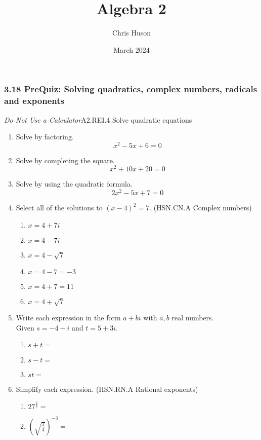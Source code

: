 \documentclass[12pt, twoside]{article}
\title{Algebra 2}
\author{Chris Huson}
\date{March 2024}
\begin{document}
\subsubsection*{3.18 PreQuiz: Solving quadratics, complex numbers, radicals and exponents }
\emph{Do Not Use a Calculator}\hfill A2.REI.4 Solve quadratic equations
\begin{enumerate}

\item Solve by factoring.
$$x^2 - 5x + 6 = 0$$ \vspace{3cm}

\item Solve by completing the square.
$$x^2 + 10x + 20 = 0$$ \vspace{6cm}

\item Solve by using the quadratic formula.
$$2x^2 - 5x + 7 = 0$$ \vspace{4cm}

\newpage 
\item Select all of the solutions to $(x-4)^2=7$. \hfill (HSN.CN.A Complex numbers)
    \begin{multicols}{2}
    \begin{enumerate}
        \item $x= 4+7i$
        \item $x= 4-7i$
        \item $x= 4 - \sqrt{7}$
        \item $x= 4-7 = -3$
        \item $x= 4+7 = 11$
        \item $x= 4 + \sqrt{7}$
    \end{enumerate}
    \end{multicols}

\item Write each expression in the form $a+bi$ with $a,b$ real numbers. \\[0.25cm]
    Given  $s = -4 - i $ and $t = 5 + 3i$.
        \begin{enumerate}[itemsep=1.5cm]
            \item $s+t =$
            \item $s-t =$
            \item $st =$
        \end{enumerate} \vspace{3cm}

\item Simplify each expression. \hfill (HSN.RN.A Rational exponents)
    \begin{multicols}{2}
    \begin{enumerate}[itemsep=0.5cm]
        \item $\displaystyle 27^{\frac{2}{3}} =$
        \item $\left( \sqrt{\frac{1}{4}} \right)^{-3} =$
    \end{enumerate}
    \end{multicols} \vspace{3cm}


\end{enumerate}
\end{document}
